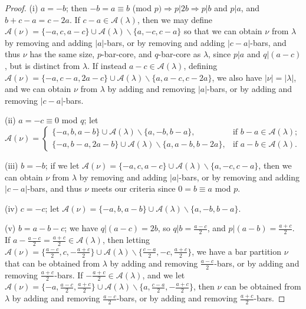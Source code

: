 \documentclass[ALCO, Unicode,published]{cedram}
\begin{document}
\begin{proof}
(i) $a=-b$; \newline
then $-b=a\equiv b$ (mod $p)\Rightarrow p|2b\Rightarrow p|b$ and $p|a$, and $b+c-a=c-2a$. If $c-a\in\mathcal{A}(\lambda)$, then we may define $\mathcal{A}(\nu)=\{-a,c,a-c\}\cup\mathcal{A}(\lambda)\backslash\{a,-c,c-a\}$ so that we can obtain $\nu$ from $\lambda$ by removing and adding $|a|$-bars, or by removing and adding $|c-a|$-bars, and thus $\nu$ has the same size, $p$-bar-core, and $q$-bar-core as $\lambda$, since $p|a$ and $q|(a-c)$, but is distinct from $\lambda$. If instead $a-c\in\mathcal{A}(\lambda)$, defining $\mathcal{A}(\nu)=\{-a,c-a,2a-c\}\cup\mathcal{A}(\lambda)\backslash\{a,a-c,c-2a\}$, we also have $|\nu|=|\lambda|$, and we can obtain $\nu$ from $\lambda$ by adding and removing $|a|$-bars, or by adding and removing $|c-a|$-bars. 

(ii) $a=-c\equiv0$ mod $q$; \newline
let $\mathcal{A}(\nu)=\begin{cases}
\{-a,b,a-b\}\cup\mathcal{A}(\lambda)\backslash\{a,-b,b-a\},&\text{if }b-a\in\mathcal{A}(\lambda);\\ 
\{-a,b-a,2a-b\}\cup\mathcal{A}(\lambda)\backslash\{a,a-b,b-2a\},&\text{if }a-b\in\mathcal{A}(\lambda).\end{cases}$ 

(iii) $b=-b$; \newline
if we let $\mathcal{A}(\nu)=\{-a,c,a-c\}\cup\mathcal{A}(\lambda)\backslash\{a,-c,c-a\}$, then we can obtain $\nu$ from $\lambda$ by removing and adding $|a|$-bars, or by removing and adding $|c-a|$-bars, and thus $\nu$ meets our criteria since $0=b\equiv a$ mod $p$.

(iv) $c=-c$; \newline
let $\mathcal{A}(\nu)=\{-a,b,a-b\}\cup\mathcal{A}(\lambda)\backslash\{a,-b,b-a\}$.

(v) $b=a-b-c$; \newline
we have $q|(a-c)=2b$, so $q|b=\tfrac{a-c}{2}$, and $p|(a-b)=\tfrac{a+c}{2}$. If $a-\tfrac{a-c}{2}=\tfrac{a+c}{2}\in\mathcal{A}(\lambda)$, then letting $\mathcal{A}(\nu)=\{\tfrac{a-c}{2},c,-\tfrac{a+c}{2}\}\cup\mathcal{A}(\lambda)\backslash\{\tfrac{c-a}{2},-c,\tfrac{a+c}{2}\}$, we have a bar partition $\nu$ that can be obtained from $\lambda$ by adding and removing $\tfrac{a-c}{2}$-bars, or by adding and removing $\tfrac{a+c}{2}$-bars. 
If $-\tfrac{a+c}{2}\in\mathcal{A}(\lambda)$, and we let $\mathcal{A}(\nu)=\{-a,\tfrac{a-c}{2},\tfrac{a+c}{2}\}\cup\mathcal{A}(\lambda)\backslash\{a,\tfrac{c-a}{2},-\tfrac{a+c}{2}\}$, then $\nu$ can be obtained from $\lambda$ by adding and removing $\tfrac{a-c}{2}$-bars, or by adding and removing $\tfrac{a+c}{2}$-bars. 


\end{proof}
\end{document}
